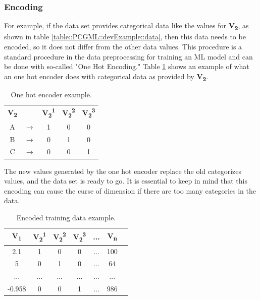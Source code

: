 \documentclass[MGS,Master,english]{twbook}%
\begin{document}
\subsubsection{Encoding}
For example, if the data set provides categorical data like the values for \textbf{V\textsubscript{2}}, as shown in table \ref{table::PCGML::devExample::data}, then this data needs to be encoded, so it does not differ from the other data values. This procedure is a standard procedure in the data preprocessing for training an ML model and can be done with so-called "One Hot Encoding." Table \ref{table::PCGML::devExample::oneHotEncoder} shows an example of what an one hot encoder does with categorical data as provided by \textbf{V\textsubscript{2}}. 
\begin{table}[!ht]
	\centering
	\begin{tabular}{|c|c|c|c|c|}
		\cline{1-1} \cline{3-5}
		\textbf{V\textsubscript{2}} &  & \textbf{V\textsubscript{2}\textsuperscript{1}} & \textbf{V\textsubscript{2}\textsuperscript{2}} & \textbf{V\textsubscript{2}\textsuperscript{3}} \\ \hhline{=~===}
		A           & $\longrightarrow$         & 1           & 0           & 0           \\ \cline{1-1} \cline{3-5} 
		B           & $\longrightarrow$         & 0           & 1           & 0           \\ \cline{1-1} \cline{3-5} 
		C           & $\longrightarrow$         & 0           & 0           & 1           \\ \cline{1-1} \cline{3-5} 
	\end{tabular}
	\caption{One hot encoder example.}
	\label{table::PCGML::devExample::oneHotEncoder}
\end{table}
The new values generated by the one hot encoder replace the old categorizes values, and the data set is ready to go. It is essential to keep in mind that this encoding can cause the curse of dimension if there are too many categories in the data.
\begin{table}[!ht]
	\centering
	\begin{tabular}{|c|c|c|c|c|c|c|}
		\hline
		\textbf{V\textsubscript{1}} & \textbf{V\textsubscript{2}\textsuperscript{1}}& \textbf{V\textsubscript{2}\textsuperscript{2}}& \textbf{V\textsubscript{2}\textsuperscript{3}} & \textbf{...} & \textbf{V\textsubscript{n}} \\ \hline\hline
		2.1         & 1   & 0   & 0       & ...          & 100         \\ \hline
		5           & 0   & 1   & 0       & ...          & 64          \\ \hline
		...         & ... & ... & ...     & ...          & ...         \\ \hline
		-0.958      & 0   & 0   & 1       & ...          & 986         \\ \hline
	\end{tabular}
	\caption{Encoded training data example.}
	\label{table::PCGML::devExample::data_encoded}
\end{table}
\end{document}
